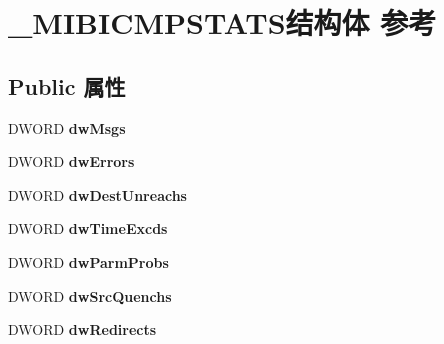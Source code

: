 \hypertarget{struct___m_i_b_i_c_m_p_s_t_a_t_s}{}\section{\+\_\+\+M\+I\+B\+I\+C\+M\+P\+S\+T\+A\+T\+S结构体 参考}
\label{struct___m_i_b_i_c_m_p_s_t_a_t_s}
\subsection*{Public 属性}
\begin{DoxyCompactItemize}
\item 
\mbox{\label{struct___m_i_b_i_c_m_p_s_t_a_t_s_a9d09105afd61d1de020028a756b5b1b4}} 
D\+W\+O\+RD {\bfseries dw\+Msgs}
\item 
\mbox{\label{struct___m_i_b_i_c_m_p_s_t_a_t_s_ab2c3caa61d9281aea7919a802867b76d}} 
D\+W\+O\+RD {\bfseries dw\+Errors}
\item 
\mbox{\label{struct___m_i_b_i_c_m_p_s_t_a_t_s_ae3a298e9dbb1e4b7ffcf7195b1f649aa}} 
D\+W\+O\+RD {\bfseries dw\+Dest\+Unreachs}
\item 
\mbox{\label{struct___m_i_b_i_c_m_p_s_t_a_t_s_a1e5401e060b9a76c6bb91d37ba0ec87b}} 
D\+W\+O\+RD {\bfseries dw\+Time\+Excds}
\item 
\mbox{\label{struct___m_i_b_i_c_m_p_s_t_a_t_s_a630eeb11f27db1854034887470f20b7f}} 
D\+W\+O\+RD {\bfseries dw\+Parm\+Probs}
\item 
\mbox{\label{struct___m_i_b_i_c_m_p_s_t_a_t_s_a7c52c473a6a70104a23fb26cac039744}} 
D\+W\+O\+RD {\bfseries dw\+Src\+Quenchs}
\item 
\mbox{\label{struct___m_i_b_i_c_m_p_s_t_a_t_s_a8753cddab76a6cfdc29b2176973ae82d}} 
D\+W\+O\+RD {\bfseries dw\+Redirects}
\item 
\mbox{\label{struct___m_i_b_i_c_m_p_s_t_a_t_s_ab4782cdf5da11868ac3d40b99aaf2214}} 

\end{DoxyCompactItemize}
